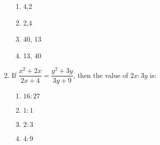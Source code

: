 \begin{enumerate}[label=(\roman*)]
        \begin{multicols}{2}
        \begin{enumerate}[label=(\alph*)]
            \item 4,2
            \item 2,4
            \item 40, 13
            \item 13, 40
        \end{enumerate}
        \end{multicols}

    \item If $\dfrac{x^2+2x}{2x+4} = \dfrac{y^2+3y}{3y+9}$, then the 
        value of $2x:3y$ is: 

        \begin{multicols}{2}
        \begin{enumerate}[label=(\alph*)]
            \item $16:27$ 
            \item $1:1$ 
            \item $2:3$ 
            \item $4:9$ 
        \end{enumerate}
        \end{multicols}

\end{enumerate}

